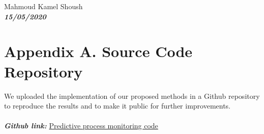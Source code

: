 \documentclass[twoside,11pt]{Latex/Classes/PhDthesisPSnPDF}
\begin{document}
\noindent
Mahmoud Kamel Shoush\\ %
\textbf{\textsl{15/05/2020}}


\appendix


	\chapter{Appendix A. Source Code Repository}
	

			We uploaded the implementation of our proposed methods in a Github repository to reproduce the results and to make it public for further improvements.\\
			\\
			
			\textbf{\textit{Github link: }} \href{https://github.com/mshoush/Predictive_Process_Monitoring_master_thesis}{Predictive process monitoring code}
	
	
\end{document}
